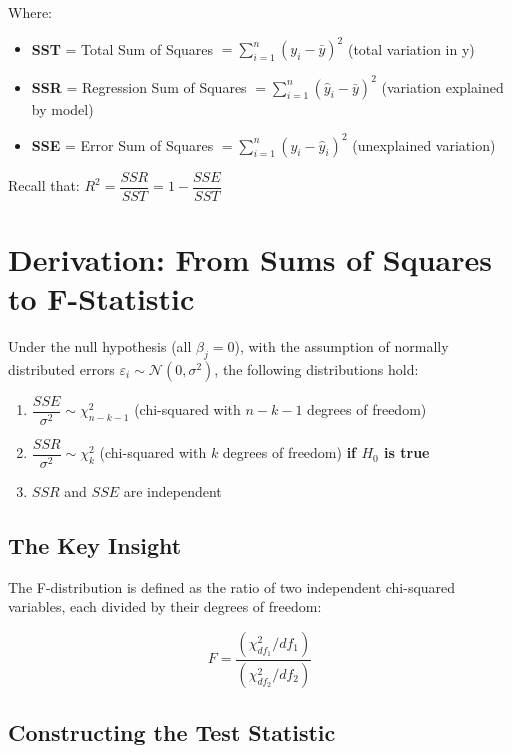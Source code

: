 \documentclass{article}
\begin{document}
Where:
\begin{itemize}
    \item \textbf{SST} = Total Sum of Squares $= \sum_{i=1}^n (y_i - \bar{y})^2$ (total variation in y)
    \item \textbf{SSR} = Regression Sum of Squares $= \sum_{i=1}^n (\hat{y}_i - \bar{y})^2$ (variation explained by model)
    \item \textbf{SSE} = Error Sum of Squares $= \sum_{i=1}^n (y_i - \hat{y}_i)^2$ (unexplained variation)
\end{itemize}

Recall that: $R^2 = \dfrac{SSR}{SST} = 1 - \dfrac{SSE}{SST}$

\section{Derivation: From Sums of Squares to F-Statistic}

Under the null hypothesis (all $\beta_j = 0$), with the assumption of normally distributed errors $\varepsilon_i \sim \mathcal{N}(0, \sigma^2)$, the following distributions hold:

\begin{enumerate}
    \item $\dfrac{SSE}{\sigma^2} \sim \chi^2_{n-k-1}$ \quad (chi-squared with $n-k-1$ degrees of freedom)
    \item $\dfrac{SSR}{\sigma^2} \sim \chi^2_{k}$ \quad (chi-squared with $k$ degrees of freedom) \textbf{if $H_0$ is true}
    \item $SSR$ and $SSE$ are independent
\end{enumerate}

\subsection*{The Key Insight}

The F-distribution is defined as the ratio of two independent chi-squared variables, each divided by their degrees of freedom:

\begin{equation}
    F = \frac{(\chi^2_{df_1} / df_1)}{(\chi^2_{df_2} / df_2)}
\end{equation}

\subsection*{Constructing the Test Statistic}
\end{document}
